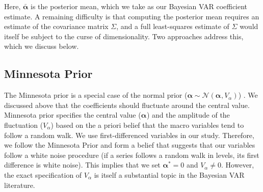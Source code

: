 \documentclass[12pt, a4paper]{article}
\begin{document}
Here, $\bar{\boldsymbol{\alpha}}$ is the posterior mean, which we take as our Bayesian VAR coefficient estimate. A remaining difficulty is that computing the posterior mean requires an estimate of the covariance matrix $\Sigma$, and a full least-squares estimate of $\Sigma$ would itself be subject to the curse of dimensionality. Two approaches address this, which we discuss below.

\subsection*{Minnesota Prior}

The Minnesota prior is a special case of the normal prior ($\boldsymbol{\alpha} \sim \mathcal{N}(\boldsymbol{\alpha}^{}, V_\alpha)$) \citep{doanForecastingConditionalProjection1984, littermanForecastingBayesianVector1986}. We discussed above that the coefficients should fluctuate around the central value. Minnesota prior specifies the central value ($\boldsymbol{\alpha}^{}$) and the amplitude of the fluctuation ($V_\alpha$) based on the a priori belief that the macro variables tend to follow a random walk. We use first-differenced variables in our study. Therefore, we follow the Minnesota Prior and form a belief that suggests that our variables follow a white noise procedure (if a series follows a random walk in levels, its first difference is white noise). This implies that we set $\boldsymbol{\alpha}^{*} = 0$ and $V_\alpha \neq 0$. However, the exact specification of $V_\alpha$ is itself a substantial topic in the Bayesian VAR literature.
\end{document}

